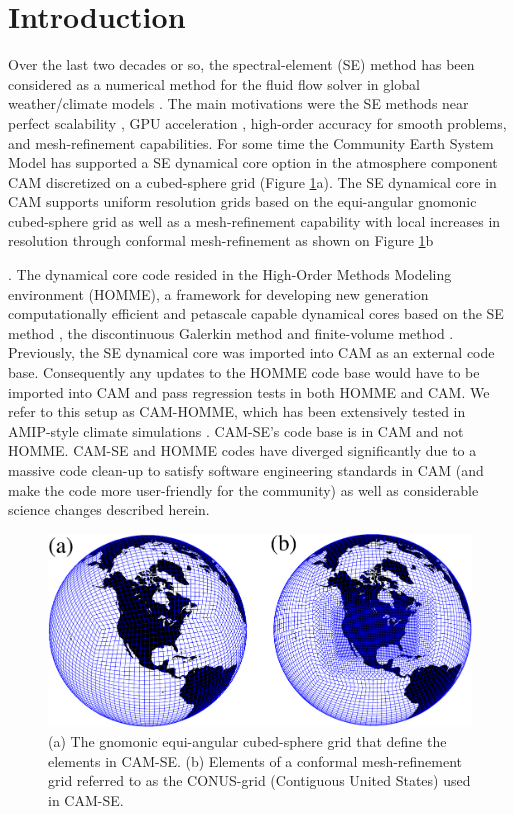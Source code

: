 \documentclass{agujournal}
\begin{document}
\section{Introduction}
Over the last two decades or so, the spectral-element (SE) method has been considered as a numerical method for the fluid flow solver in  global weather/climate models \citep{FT2004MWR,BWTF2006MWR,KG2012JCP,GKC2013SIAM,CH2016APJAS}. The main motivations were the SE methods near perfect scalability \citep{DetAl2012IJHPCA}, GPU acceleration \citep[e.g.][]{AWWGIJHPCA,AetAl2017IJHPCA}, high-order accuracy for smooth problems, and mesh-refinement capabilities. For some time the Community Earth System Model \citep[CESM; ][]{CESM1} has supported a SE dynamical core option in the atmosphere component CAM \citep[Community Atmosphere Model; ][]{CAM5} discretized on a cubed-sphere grid (Figure \ref{fig:grids}a). The SE dynamical core in CAM supports uniform resolution grids based on the equi-angular gnomonic cubed-sphere grid as well as a mesh-refinement capability with local increases in resolution through conformal mesh-refinement as shown on Figure \ref{fig:grids}b {\citep{FT2004MWR,BWTF2006MWR,ZetAl2014JC,ZetAl2014JCb}. The dynamical core code resided in the High-Order Methods Modeling environment (HOMME), a framework for developing new generation computationally efficient and petascale capable dynamical cores based on the SE method \citep{TL2000JSC,TES2008JPCS}, the discontinuous Galerkin method \citep{NCT2009CF} and finite-volume method \citep{ELGT2012PCS,LTOUNGK2017MWR}. Previously, the SE dynamical core was imported into CAM as an external code base. Consequently any updates to the HOMME code base would have to be imported into CAM and pass regression tests in both HOMME and CAM. We refer to this setup as CAM-HOMME, which has been extensively tested in AMIP-style climate simulations \citep[e.g., ][]{ELMNTT2012JC,ZJ2014JAMES,RetAl2015GRL,BetAl2016CC,RHUZ2016JAMC,GetAl2017JAMES}. CAM-SE's code base is in CAM and not HOMME. CAM-SE and HOMME codes have diverged significantly due to a  massive code clean-up to satisfy software engineering standards in CAM (and make the code more user-friendly for the community) as well as considerable science changes described herein.
  \begin{figure}[h]
\centering
 \includegraphics[scale=0.45]{figs/grids}
 \caption{(a) The gnomonic equi-angular cubed-sphere grid that define the elements in CAM-SE. (b) Elements of a conformal mesh-refinement grid referred to as the CONUS-grid (Contiguous United States) used in CAM-SE.}
 \label{fig:grids}
\end{figure}


}
\end{document}
